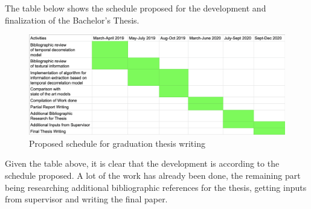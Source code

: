 The table below shows the schedule proposed for the development and finalization of the Bachelor's Thesis.
\begin{figure}[H]
    \centering
    \includegraphics[width=1.1\linewidth]{Final Remarks/tabela.png}
    \caption{Proposed schedule for graduation thesis writing}
    \label{fig:tabela}
\end{figure}

Given the table above, it is clear that the development is according to the schedule proposed. A lot of the work has already been done, the remaining part being researching additional bibliographic references for the thesis, getting inputs from supervisor and writing the final paper.